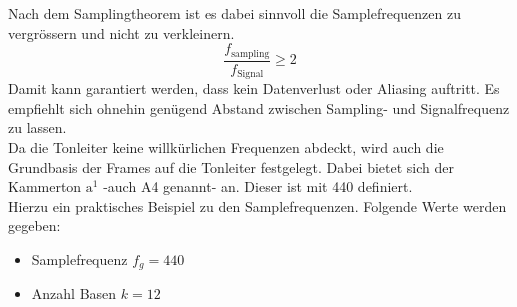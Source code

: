 Nach dem Samplingtheorem ist es dabei sinnvoll die Samplefrequenzen zu vergrössern und nicht zu verkleinern.
\[ \frac{f_{\text{sampling}}}{f_{\text{Signal}}} \geq 2\]
Damit kann garantiert werden, dass kein Datenverlust oder Aliasing auftritt. Es empfiehlt sich ohnehin genügend Abstand zwischen Sampling- und Signalfrequenz zu lassen.\\

Da die Tonleiter keine willkürlichen Frequenzen abdeckt, wird auch die Grundbasis der Frames auf die Tonleiter festgelegt. Dabei bietet sich der Kammerton $\text{a}^{1}$ -auch A4 genannt- an. Dieser ist mit 440 \text{[Hz]} definiert.\\




Hierzu ein praktisches Beispiel zu den Samplefrequenzen. Folgende Werte werden gegeben:
\begin{itemize}
	\item Samplefrequenz $f_{g}=440$\text{[Hz]}
	\item Anzahl Basen $k=12$
\end{itemize}	

